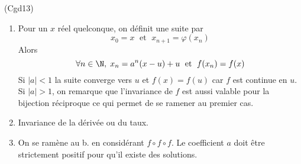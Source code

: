 \begin{tiny}(Cgd13)\end{tiny}
\begin{enumerate}
  \item Pour un $x$ réel quelconque, on définit une suite par 
\begin{displaymath}
x_0 = x \;\text{ et }\; x_{n+1} = \varphi(x_n) 
\end{displaymath}
Alors
\begin{displaymath}
\forall n\in \N,\;  x_n = a^n(x-u) +u\; \text{ et }\; f(x_n)=f(x)
\end{displaymath}
Si $|a|<1$ la suite converge vers $u$ et $f(x)=f(u)$ car $f$ est continue en $u$.\newline
Si $|a|>1$, on remarque que l'invariance de $f$ est aussi valable pour la bijection réciproque ce qui permet de se ramener au premier cas.
  \item Invariance de la dérivée ou du taux.
  \item On se ramène au b. en considérant $f\circ f \circ f$. Le coefficient $a$ doit être strictement positif pour qu'il existe des solutions.
\end{enumerate}
